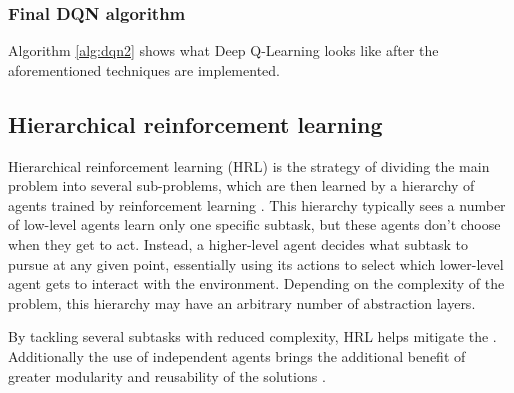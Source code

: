 \subsubsection*{Final DQN algorithm}

Algorithm \ref{alg:dqn2} shows what Deep Q-Learning looks like after the aforementioned techniques are implemented.

\subsection{Hierarchical reinforcement learning}

Hierarchical reinforcement learning (HRL) is the strategy of dividing the main problem into several sub-problems, which are then learned by a hierarchy of agents trained by reinforcement learning \cite{Barto:2003, Al-Emran:2015, Pateria:2021}. This hierarchy typically sees a number of low-level agents learn only one specific subtask, but these agents don't choose when they get to act. Instead, a higher-level agent decides what subtask to pursue at any given point, essentially using its actions to select which lower-level agent gets to interact with the environment. Depending on the complexity of the problem, this hierarchy may have an arbitrary number of abstraction layers.

By tackling several subtasks with reduced complexity, HRL helps mitigate the . Additionally the use of independent agents brings the additional benefit of greater modularity and reusability of the solutions \cite{Al-Emran:2015}.